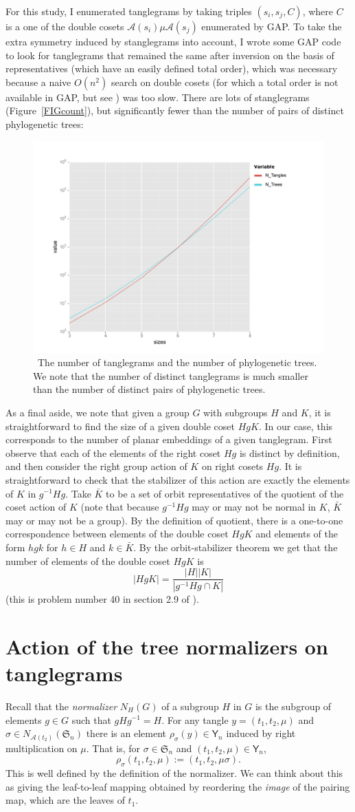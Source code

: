 \documentclass{amsart}
\newcommand{\fS}{\mathfrak S}
\newcommand{\aut}{\mathcal A}
\newcommand{\pairing}{\mu}
\newcommand{\tangle}{\mathsf{Y}}
\newcommand{\arxiv}[1]{#1}
\newcommand{\FIGcount}{\
\label{FIGcount}
\begin{figure}
  \arxiv{\includegraphics[width=5in]{figures/count}}
\caption{\
  The number of tanglegrams and the number of phylogenetic trees.
  We note that the number of distinct tanglegrams is much smaller than the number of distinct pairs of phylogenetic trees.
}
\end{figure}
}
\begin{document}
For this study, I enumerated tanglegrams by taking triples $(s_i, s_j, C)$, where $C$ is a one of the double cosets $\aut(s_i) \pairing \aut(s_j)$ enumerated by GAP.
To take the extra symmetry induced by stanglegrams into account, I wrote some GAP code to look for tanglegrams that remained the same after inversion on the basis of representatives (which have an easily defined total order), which was necessary because a naive $O(n^2)$ search on double cosets (for which a total order is not available in GAP, but see \cite{Hulpke2003-em}) was too slow.
There are lots of stanglegrams (Figure~\ref{FIGcount}), but significantly fewer than the number of pairs of distinct phylogenetic trees:
\FIGcount

As a final aside, we note that given a group $G$ with subgroups $H$ and $K$, it is straightforward to find the size of a given double coset $HgK$.
In our case, this corresponds to the number of planar embeddings of a given tanglegram.
First observe that each of the elements of the right coset $Hg$ is distinct by definition, and then consider the right group action of $K$ on right cosets $Hg$.
It is straightforward to check that the stabilizer of this action are exactly the elements of $K$ in $g^{-1} H g$.
Take $\bar K$ to be a set of orbit representatives of the quotient of the coset action of $K$ (note that because $g^{-1} H g$ may or may not be normal in $K$, $\bar K$ may or may not be a group).
By the definition of quotient, there is a one-to-one correspondence between elements of the double coset $HgK$ and elements of the form $hgk$ for $h \in H$ and $k \in \bar K$.
By the orbit-stabilizer theorem we get that the number of elements of the double coset $HgK$ is
\begin{equation}
\label{eq:doubleCosetOrder}
|HgK| = \frac{|H| |K|}{|g^{-1} H g \cap K|}
\end{equation}
(this is problem number 40 in section 2.9 of \cite{herstein2006topics}).


\section{Action of the tree normalizers on tanglegrams}
Recall that the \emph{normalizer} $N_H(G)$ of a subgroup $H$ in $G$ is the subgroup of elements $g \in G$ such that $gHg^{-1} = H$.
For any tangle $y = (t_1, t_2, \pairing)$ and $\sigma \in N_{\aut(t_2)}(\fS_n)$ there is an element $\rho_\sigma(y) \in \tangle_n$ induced by right multiplication on $\pairing$.
That is, for $\sigma \in \fS_n$ and $(t_1, t_2, \pairing) \in \tangle_n$,
\begin{equation}
\label{eq:action}
\rho_\sigma (t_1, t_2, \pairing) := (t_1, t_2, \pairing \sigma).
\end{equation}
This is well defined by the definition of the normalizer.
We can think about this as giving the leaf-to-leaf mapping obtained by reordering the \emph{image} of the pairing map, which are the leaves of $t_1$.
\end{document}
